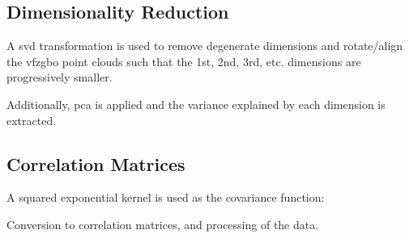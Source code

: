 \documentclass[final,twocolumn,12pt]{elsarticle}
\begin{document}
%	
%	
%	
%	
%	

    \subsection{Dimensionality Reduction}
    A \gls{svd} transformation is used to remove degenerate dimensions and rotate/align the \gls{vfzgbo} point clouds such that the 1st, 2nd, 3rd, etc. dimensions are progressively smaller.
    
    Additionally, \gls{pca} is applied and the variance explained by each dimension is extracted.

    \subsection{Correlation Matrices} \label{sec:methods:correlation}
    A squared exponential kernel is used as the covariance function:
    
    Conversion to correlation matrices, and processing of the data. %
    
\end{document}
